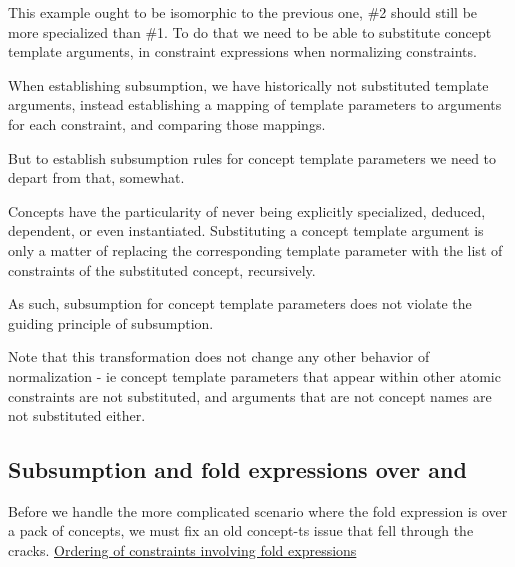 \documentclass{wg21}
\begin{document}
This example ought to be isomorphic to the previous one, \#2 should still be more specialized than \#1.
To do that we need to be able to substitute concept template arguments, in constraint expressions when normalizing constraints.

When establishing subsumption, we have historically not substituted template arguments, instead establishing a mapping of template parameters to arguments for each
constraint, and comparing those mappings.

But to establish subsumption rules for concept template parameters we need to depart from that, somewhat.

Concepts have the particularity of never being explicitly specialized, deduced, dependent, or even instantiated.
Substituting a concept template argument is only a matter of replacing the corresponding template parameter with the list of constraints of the substituted
concept, recursively.

As such, subsumption for concept template parameters does not violate the guiding principle of subsumption.


Note that this transformation does not change any other behavior of normalization - ie concept template parameters that appear within other atomic constraints
are not substituted, and arguments that are not concept names are not substituted either.

\subsection{Subsumption and fold expressions over \tcode{\&\&} and \tcode{||}}

Before we handle the more complicated scenario where the fold expression is over a pack of concepts, we must fix an old concept-ts issue that fell through the cracks.
\href{http://cplusplus.github.io/concepts-ts/ts-active.html#28}{Ordering of constraints involving fold expressions}
\end{document}

